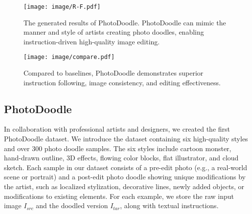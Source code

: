 


\begin{figure*}[ht]
    \centering
    \texttt{[image: image/R-F.pdf]} %
    \caption{The generated results of PhotoDoodle. PhotoDoodle can mimic the manner and style of artists creating photo doodles, enabling instruction-driven high-quality image editing.}
    \label{fig3}

\end{figure*}

\begin{figure*}[ht]
    \centering
    \texttt{[image: image/compare.pdf]} %

    \caption{ Compared to baselines, PhotoDoodle demonstrates superior instruction following, image consistency, and editing effectiveness.}
    \label{fig4}

\end{figure*}


\subsection{PhotoDoodle}

In collaboration with professional artists and designers, we created the first PhotoDoodle dataset. We introduce the dataset containing six high-quality styles and over 300 photo doodle samples. The six styles include cartoon monster, hand-drawn outline, 3D effects, flowing color blocks, flat illustrator, and cloud sketch. Each sample in our dataset consists of a pre-edit photo (e.g., a real-world scene or portrait) and a post-edit photo doodle showing unique modifications by the artist, such as localized stylization, decorative lines, newly added objects, or modifications to existing elements. For each example, we store the raw input image $I_{src}$ and the doodled version $I_{tar}$, along with textual instructions.

